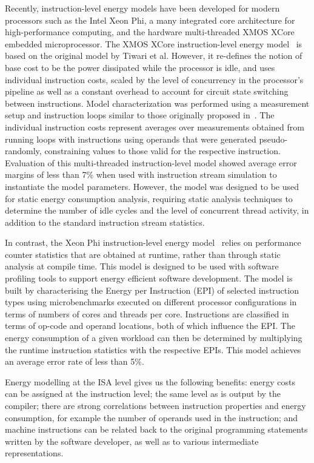 Recently, instruction-level energy models have been developed for modern
processors such as the Intel Xeon Phi, a many integrated core architecture for
high-performance computing, and the hardware multi-threaded XMOS XCore embedded
microprocessor.
%
The XMOS XCore instruction-level energy
model~\cite{DBLP:journals/tecs/KerrisonE15} is based on the original model by
Tiwari et al. However, it re-defines the notion of base cost to be the power dissipated
while the processor is idle, and  uses individual instruction costs, scaled by
the level of concurrency in the processor's pipeline as well as a constant overhead to
account for circuit state switching between instructions.
%
Model characterization was performed using a measurement setup and instruction
loops similar to those originally proposed in~\cite{Tiwari-embedded-1994}. The
individual instruction costs represent averages over measurements obtained from
running loops with instructions using operands that were generated
pseudo-randomly, constraining values to those valid for the respective
instruction.
%
Evaluation of this multi-threaded instruction-level model showed average error
margins of less than 7\% when used with instruction stream simulation to
instantiate the model parameters.
%
However, the model was designed to be used for static energy consumption analysis,
requiring static analysis techniques to determine the number of idle cycles and
the level of concurrent thread activity, in addition to the standard
instruction stream statistics.

In contrast, the Xeon Phi instruction-level energy model~\cite{phimodel} relies
on performance counter statistics that are obtained at runtime, rather than
through static analysis at compile time. This model is designed to be used with
software profiling tools to support energy efficient software development. The
model is built by characterising the Energy per Instruction (EPI) of selected
instruction types using microbenchmarks executed on different processor
configurations in terms of numbers of cores and threads per core. Instructions are classified in terms of op-code and operand locations, both of which influence the EPI.
%
The energy consumption of a given workload can then be determined by
multiplying the runtime instruction statistics with the respective EPIs.
%
This model achieves an average error rate of less than 5\%.


Energy modelling at the ISA level gives us the following benefits: energy
costs can be assigned at the instruction level; the same level as is output by
the compiler; there are strong correlations between instruction properties and
energy consumption, for example the number of operands used in the instruction;
and machine instructions can be related back to the original programming
statements written by the software developer, as well as to various
intermediate representations. 

